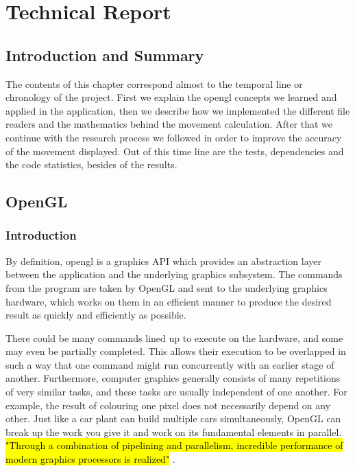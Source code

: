 \section{Technical Report}		
\subsection{Introduction and Summary}

The contents of this chapter correspond almost to the temporal line or chronology of the project. First we explain the \gls{opengl} concepts we learned and applied in the application, then we describe how we implemented the different file readers and the mathematics behind the movement calculation. After that we continue with the research process we followed in order to improve the accuracy of the movement displayed. Out of this time line are the tests, dependencies and the code statistics, besides of the results.


\subsection{OpenGL} \label{opengl}

\subsubsection{Introduction}

By definition, \gls{opengl} is a graphics API which provides an abstraction layer between the application and the underlying graphics subsystem. 
The commands \cite{superbible} from the program are taken by OpenGL and sent to the underlying graphics hardware, which works on them in an efficient manner to produce the desired result as quickly and efficiently as possible.

There could be many commands lined up to execute on the hardware, and some may even be partially completed. This allows their execution to be overlapped in such a way that one command might run concurrently with an earlier stage of another. Furthermore, computer graphics generally consists of many repetitions of very similar tasks, and these tasks are usually independent of one another. For example, the result of colouring one pixel does not necessarily depend on any other. Just like a car plant can build multiple cars simultaneously, OpenGL can break up the work you give it and work on its fundamental elements in parallel. \hl{"Through a combination of pipelining and parallelism, incredible performance of modern graphics processors is realized"} \cite{superbible}.

